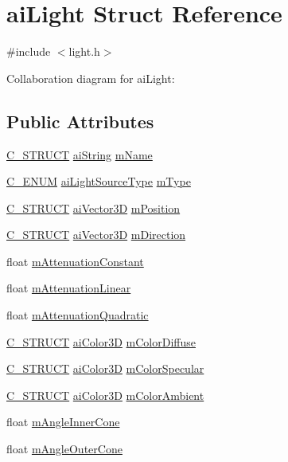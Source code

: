 \hypertarget{structai_light}{\section{ai\-Light Struct Reference}
\label{structai_light}
}


{\ttfamily \#include $<$light.\-h$>$}



Collaboration diagram for ai\-Light\-:
\subsection*{Public Attributes}
\begin{DoxyCompactItemize}
\item 
\hyperlink{defs_8h_ab51df4230ceb602bbc1bc109c432a6a0}{C\-\_\-\-S\-T\-R\-U\-C\-T} \hyperlink{structai_string}{ai\-String} \hyperlink{structai_light_a92806413f16230728b04e5f379fd00c0}{m\-Name}
\item 
\hyperlink{defs_8h_aa8c1788fd9d096036c9e3b6cfe4b1301}{C\-\_\-\-E\-N\-U\-M} \hyperlink{include_2assimp_2include_2light_8h_a7a75cb224d903e71e8daede432449766}{ai\-Light\-Source\-Type} \hyperlink{structai_light_a4cba1741875dd92724ff55be91c60c2b}{m\-Type}
\item 
\hyperlink{defs_8h_ab51df4230ceb602bbc1bc109c432a6a0}{C\-\_\-\-S\-T\-R\-U\-C\-T} \hyperlink{structai_vector3_d}{ai\-Vector3\-D} \hyperlink{structai_light_a5daf9c9ad2613603b847a527123611f0}{m\-Position}
\item 
\hyperlink{defs_8h_ab51df4230ceb602bbc1bc109c432a6a0}{C\-\_\-\-S\-T\-R\-U\-C\-T} \hyperlink{structai_vector3_d}{ai\-Vector3\-D} \hyperlink{structai_light_af3776d5e4e6065cb6dd7e10dc656dada}{m\-Direction}
\item 
float \hyperlink{structai_light_ae8804b3c309527ca0f85d676bab55710}{m\-Attenuation\-Constant}
\item 
float \hyperlink{structai_light_aefda311eaa785ea345782dfa95be817c}{m\-Attenuation\-Linear}
\item 
float \hyperlink{structai_light_ab4fb07bfa40a807661b1ed1791838a6d}{m\-Attenuation\-Quadratic}
\item 
\hyperlink{defs_8h_ab51df4230ceb602bbc1bc109c432a6a0}{C\-\_\-\-S\-T\-R\-U\-C\-T} \hyperlink{structai_color3_d}{ai\-Color3\-D} \hyperlink{structai_light_a22e7feebbfaf53adf73bd9f581636efd}{m\-Color\-Diffuse}
\item 
\hyperlink{defs_8h_ab51df4230ceb602bbc1bc109c432a6a0}{C\-\_\-\-S\-T\-R\-U\-C\-T} \hyperlink{structai_color3_d}{ai\-Color3\-D} \hyperlink{structai_light_aa79ae6ad6a10f0cb9c740e23b6bb01bf}{m\-Color\-Specular}
\item 
\hyperlink{defs_8h_ab51df4230ceb602bbc1bc109c432a6a0}{C\-\_\-\-S\-T\-R\-U\-C\-T} \hyperlink{structai_color3_d}{ai\-Color3\-D} \hyperlink{structai_light_a5188b60e6fbaf1635fa780913508e3cd}{m\-Color\-Ambient}
\item 
float \hyperlink{structai_light_abad0466811938623e98bf1d334143f9a}{m\-Angle\-Inner\-Cone}
\item 
float \hyperlink{structai_light_a20fd332a5f9d8e8cb94816ff2b0ae7f4}{m\-Angle\-Outer\-Cone}
\end{DoxyCompactItemize}



